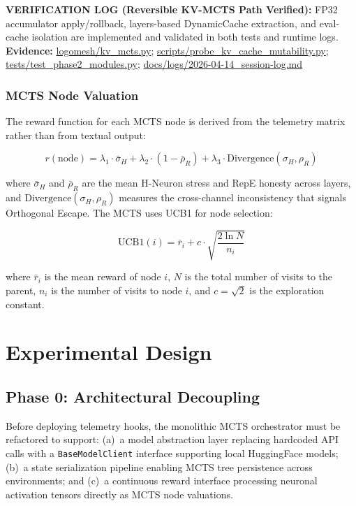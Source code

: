 \documentclass[10pt]{article}
\newcommand{\verifybox}[3]{%
\vspace{0.6em}
\noindent\colorbox{yellow!20}{%
\parbox{\dimexpr\linewidth-2\fboxsep\relax}{%
\textbf{VERIFICATION LOG (#1):} #2\\
\textbf{Evidence:} #3
}}%
\vspace{0.6em}
}
\begin{document}
\verifybox
{Reversible KV-MCTS Path Verified}
{FP32 accumulator apply/rollback, layers-based DynamicCache extraction, and eval-cache isolation are implemented and validated in both tests and runtime logs.}
{\url{logomesh/kv_mcts.py}; \url{scripts/probe_kv_cache_mutability.py}; \url{tests/test_phase2_modules.py}; \url{docs/logs/2026-04-14_session-log.md}}

\subsubsection{MCTS Node Valuation}

The reward function for each MCTS node is derived from the telemetry matrix rather than from textual output:

\begin{equation}
r(\text{node}) = \lambda_1 \cdot \bar{\sigma}_H + \lambda_2 \cdot (1 - \bar{\rho}_R) + \lambda_3 \cdot \text{Divergence}(\sigma_H, \rho_R)
\label{eq:mcts_reward}
\end{equation}

where $\bar{\sigma}_H$ and $\bar{\rho}_R$ are the mean H-Neuron stress and RepE honesty across layers, and $\text{Divergence}(\sigma_H, \rho_R)$ measures the cross-channel inconsistency that signals Orthogonal Escape. The MCTS uses UCB1 for node selection:

\begin{equation}
\text{UCB1}(i) = \bar{r}_i + c \cdot \sqrt{\frac{2 \ln N}{n_i}}
\label{eq:ucb1}
\end{equation}

where $\bar{r}_i$ is the mean reward of node $i$, $N$ is the total number of visits to the parent, $n_i$ is the number of visits to node $i$, and $c = \sqrt{2}$ is the exploration constant.

\section{Experimental Design}

\subsection{Phase 0: Architectural Decoupling}

Before deploying telemetry hooks, the monolithic MCTS orchestrator must be refactored to support: (a)~a model abstraction layer replacing hardcoded API calls with a \texttt{BaseModelClient} interface supporting local HuggingFace models; (b)~a state serialization pipeline enabling MCTS tree persistence across environments; and (c)~a continuous reward interface processing neuronal activation tensors directly as MCTS node valuations.
\end{document}
